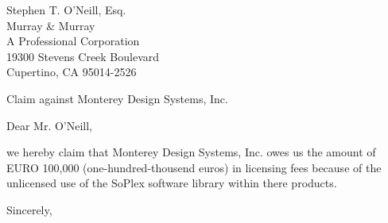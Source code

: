 \documentclass[11pt]{zibletter}
\begin{document}
\begin{letter}{%
Stephen T. O'Neill, Esq.\\
Murray \& Murray\\
A Professional Corporation\\
19300 Stevens Creek Boulevard\\
Cupertino, CA 95014-2526
}
\thispagestyle{empty}
\opening{Claim against Monterey Design Systems, Inc.}

Dear Mr. O'Neill,

we hereby claim that Monterey Design Systems, Inc. owes
us the amount of EURO 100,000 (one-hundred-thousend euros) 
in licensing fees because of the 
unlicensed use of the SoPlex software library within there
products. 

\closing{Sincerely,}
\end{letter}
\end{document}
